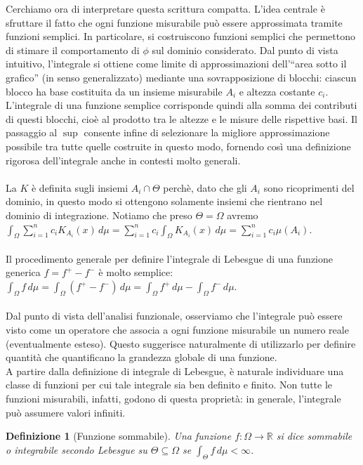\documentclass[a4paper,12pt]{report}
\newtheorem{definizione}{Definizione}[chapter]
\newcommand{\lt}{<}
\begin{document}
Cerchiamo ora di interpretare questa scrittura compatta. L'idea centrale è sfruttare il fatto che ogni funzione misurabile può essere approssimata tramite funzioni semplici. In particolare, si costruiscono funzioni semplici che permettono di stimare il comportamento di $\phi$ sul dominio considerato.
Dal punto di vista intuitivo, l'integrale si ottiene come limite di approssimazioni dell’“area sotto il grafico” (in senso generalizzato) mediante una sovrapposizione di blocchi: ciascun blocco ha base costituita da un insieme misurabile $A_i$ e altezza costante $c_i$. L'integrale di una funzione semplice corrisponde quindi alla somma dei contributi di questi blocchi, cioè al prodotto tra le altezze e le misure delle rispettive basi.
Il passaggio al $\sup$ consente infine di selezionare la migliore approssimazione possibile tra tutte quelle costruite in questo modo, fornendo così una definizione rigorosa dell'integrale anche in contesti molto generali.
\\
\\ La $K$ è definita sugli insiemi $A_i \cap \Theta$ perchè, dato che gli $A_i$ sono ricoprimenti del dominio, in questo modo si ottengono solamente insiemi che rientrano nel dominio di integrazione.  Notiamo che preso $\Theta =\Omega$ avremo $\displaystyle\int_\Omega\sum_{i=1}^nc_i K_{A_i}(x)\,d\mu=\sum_{i=1}^nc_i\int_\Omega K_{A_i}(x)\,d\mu=\sum_{i=1}^nc_i\mu(A_i)$. 
\\ 
\\Il procedimento generale per definire l'integrale di Lebesgue di una funzione generica $f=f
^+-f^-$ è molto semplice: $\displaystyle\int_\Omega f \,d\mu=\int_\Omega (f^+-f^-)\,d\mu=\int_\Omega f^+\,d\mu-\int_\Omega f^- \,d\mu$.
\\
\\
Dal punto di vista dell’analisi funzionale, osserviamo che l’integrale può essere visto come un operatore che associa a ogni funzione misurabile un numero reale (eventualmente esteso). Questo suggerisce naturalmente di utilizzarlo per definire quantità che quantificano la grandezza globale di una funzione.
\\A partire dalla definizione di integrale di Lebesgue, è naturale individuare una classe di funzioni per cui tale integrale sia ben definito e finito. Non tutte le funzioni misurabili, infatti, godono di questa proprietà: in generale, l’integrale può assumere valori infiniti.


\begin{definizione}[Funzione sommabile]\label{def: 3.12}
    Una funzione $f: \Omega \to \mathbb{R}$ si dice sommabile o integrabile secondo Lebesgue su $\Theta \subseteq \Omega$ se $\displaystyle\int_\Theta f\,d\mu \lt \infty$.
\end{definizione}
\end{document}

